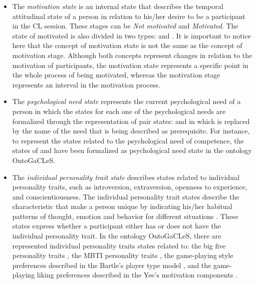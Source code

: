\begin{itemize}
\item
The \emph{motivation state} is an internal state that describes the temporal attitudinal state of a person in relation to his/her desire to be a participant in the CL session. These stages can be \emph{Not motivated} and \emph{Motivated}. The state of motivated is also divided in two types:  and  \cite{DeciRyan2010}. It is important to notice here that the concept of motivation state is not the same as the concept of motivation stage. Although both concepts represent changes in relation to the motivation of participants, the motivation state represents a specific point in the whole process of being motivated, whereas the motivation stage represents an interval in the motivation process.

\item
The \emph{psychological need state} represents the current psychological need of a person in which the states for each one of the psychological needs are formalized through the representation of pair states:  and  in which  is replaced by the name of the need that is being described as prerequisite. For instance, to represent the states related to the psychological need of competence, the states of  and  have been formalized as psychological need state in the ontology OntoGaCLeS.

\item
The \emph{individual personality trait state} describes states related to individual personality traits, such as introversion, extraversion, openness to experience, and conscientiousness. The individual personality trait states describe the characteristic that make a person unique by indicating his/her habitual patterns of thought, emotion and behavior for different situations \cite{MatthewsDearyWhiteman2003}. These states express whether a participant either has or does not have the individual personality trait. In the ontology OntoGaCLeS, there are represented individual personality traits states related to: the big five personality traits \cite{CostaMacCrae1992}, the MBTI personality traits \cite{Briggs1976}, the game-playing style preferences described in the Bartle's player type model \cite{Bartle2004}, and the game-playing liking preferences described in the Yee's motivation components \cite{Yee2006}.
\end{itemize}

